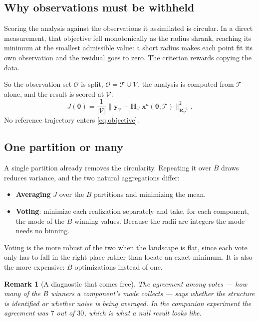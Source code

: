 \documentclass[11pt,a4paper]{article}
\newtheorem{remark}{Remark}
\theoremstyle{definition}
\newcommand{\Hmat}{\mathbf{H}}
\newcommand{\Rmat}{\mathbf{R}}
\newcommand{\xvec}{\mathbf{x}}
\newcommand{\yvec}{\mathbf{y}}
\begin{document}
\subsection{Why observations must be withheld}

Scoring the analysis against the observations it assimilated is circular. In a
direct measurement, that objective fell monotonically as the radius shrank,
reaching its minimum at the smallest admissible value: a short radius makes each
point fit its own observation and the residual goes to zero. The criterion
rewards copying the data.

So the observation set $\mathcal{O}$ is split, $\mathcal{O} = \mathcal{T} \cup
\mathcal{V}$, the analysis is computed from $\mathcal{T}$ alone, and the result
is scored at $\mathcal{V}$:
%
\begin{equation}
  J(\boldsymbol{\theta})
  = \frac{1}{|\mathcal{V}|}
    \big\| \yvec_{\mathcal{V}}
           - \Hmat_{\mathcal{V}}\,\xvec^{a}(\boldsymbol{\theta}; \mathcal{T})
    \big\|^{2}_{\Rmat^{-1}_{\mathcal{V}}} .
  \label{eq:objective}
\end{equation}
%
No reference trajectory enters \eqref{eq:objective}.

\subsection{One partition or many}

A single partition already removes the circularity. Repeating it over $B$ draws
reduces variance, and the two natural aggregations differ:

\begin{itemize}
  \item \textbf{Averaging} $J$ over the $B$ partitions and minimizing the mean.
  \item \textbf{Voting}: minimize each realization separately and take, for each
        component, the mode of the $B$ winning values. Because the radii are
        integers the mode needs no binning.
\end{itemize}

Voting is the more robust of the two when the landscape is flat, since each
vote only has to fall in the right place rather than locate an exact minimum.
It is also the more expensive: $B$ optimizations instead of one.

\begin{remark}[A diagnostic that comes free]
The agreement among votes --- how many of the $B$ winners a component's mode
collects --- says whether the structure is identified or whether noise is being
averaged. In the companion experiment the agreement was $7$ out of $30$, which
is what a null result looks like.
\end{remark}
\end{document}
